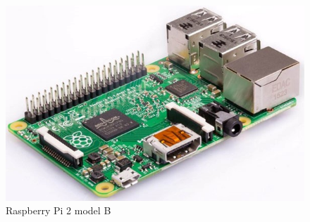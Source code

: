 \begin{figure}[H]
	\centering
	\includegraphics[width=0.7\linewidth]{pics/raspberry}
	\caption{Raspberry Pi 2 model B}
	\label{fig:raspberry} 
\end{figure}


